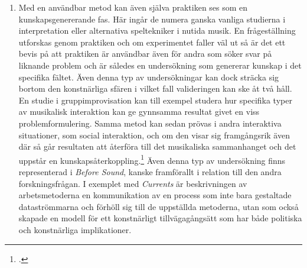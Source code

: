\documentclass[11pt]{article}
\begin{document}
\begin{enumerate}
  \item Med en användbar metod kan även själva praktiken ses som en
    kunskapsgenererande fas. Här ingår de numera ganska vanliga
    studierna i interpretation eller alternativa speltekniker i nutida
    musik. En frågeställning utforskas genom praktiken och om
    experimentet faller väl ut så är det ett bevis på att praktiken är
    användbar även för andra som söker svar på liknande problem och är
    således en undersökning som genererar kunskap i det specifika
    fältet. Även denna typ av undersökningar kan dock sträcka sig
    bortom den konstnärliga sfären i vilket fall valideringen kan ske
    åt två håll. En studie i gruppimprovisation kan till exempel
    studera hur specifika typer av musikalisk interaktion kan ge
    gynnsamma resultat givet en viss problemformulering. Samma metod
    kan sedan prövas i andra interaktiva situationer, som social
    interaktion, och om den visar sig framgångsrik även där så går
    resultaten att återföra till det musikaliska sammanhanget och det
    uppstår en kunskapsåterkoppling.\footcite[Se t.ex. projektet ICASP
    som jobbade enligt denna modell:][]{lewis09} Även denna typ av
    undersökning finns representerad i \emph{Before Sound}, kanske
    framförallt i relation till den andra forskningsfrågan. I exemplet
    med \emph{Currents} är beskrivningen av arbetsmetoderna en
    kommunikation av en process som inte bara gestaltade
    dataströmmarna och förhöll sig till de uppställda metoderna, utan
    som också skapade en modell för ett konstnärligt tillvägagångsätt
    som har både politiska och konstnärliga implikationer.




\end{enumerate}
\end{document}
